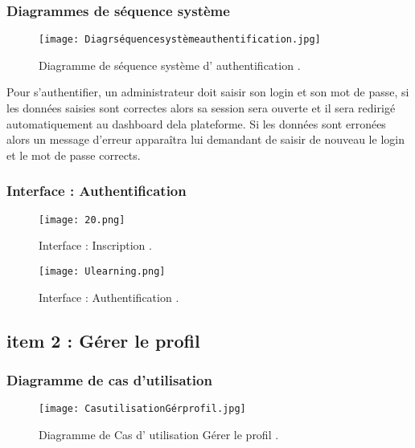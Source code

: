 \subsubsection{Diagrammes de séquence système }
\begin{figure}[ht]
	\centering
	\texttt{[image: Diagrséquencesystèmeauthentification.jpg]}
	\caption{Diagramme de séquence système d' authentification .}
	\label{fig:Diagramme de séquence système d' authentification }
\end{figure}
\FloatBarrier
Pour s’authentifier, un administrateur doit saisir son login et son mot de passe, si les
données saisies sont correctes alors sa session sera ouverte et il sera redirigé automatiquement au dashboard dela plateforme. Si les données sont erronées alors un message d’erreur
apparaîtra lui demandant de saisir de nouveau le login et le mot de passe corrects.
\clearpage
\subsubsection{ Interface : Authentification  }


\begin{figure}[ht]
	\centering
	\texttt{[image: 20.png]}
	\caption{Interface : Inscription .}
	\label{fig:Interface : inscription }
\end{figure}
\FloatBarrier

\begin{figure}[ht]
	\centering
	\texttt{[image: Ulearning.png]}
	\caption{Interface : Authentification .}
	\label{fig:Interface : Gérer le profil }
\end{figure}
\FloatBarrier
\clearpage
\subsection{item 2 : Gérer le profil}
\subsubsection{Diagramme de cas d’utilisation }


\begin{figure}[ht]
	\centering
	\texttt{[image: CasutilisationGérprofil.jpg]}
	\caption{Diagramme de Cas d' utilisation Gérer le profil .}
	\label{fig:Gérer le profil }
\end{figure}
\FloatBarrier



